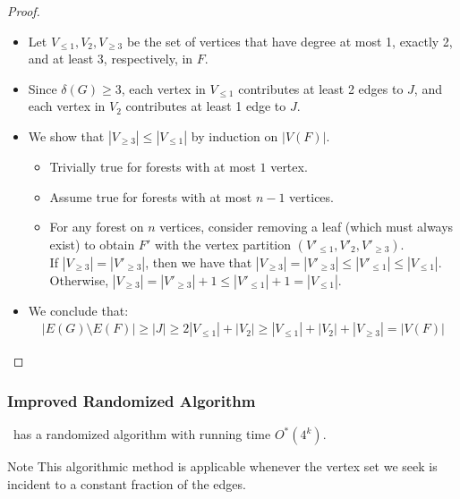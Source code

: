 \begin{frame}[c]
\begin{proof}
    \begin{itemize}
        \item Let $V_{\leq 1}, V_{2}, V_{\geq 3} $ be the set of vertices that have degree at most 1, exactly 2, and at least 3, respectively, in $F$. 
        \pause
        \item     Since $\delta(G)\ge 3$, each vertex in $V_{\leq 1}$ contributes at least 2 edges to $J$, and each vertex in $V_{2}$ contributes at least 1 edge to $J$. 
        \pause
        \item We show that $|V_{\geq 3}| \le |V_{\leq 1}|$ by induction on $|V(F)|$.
        \begin{itemize}
            \item Trivially true for forests with at most $1$ vertex.
            \item Assume true for forests with at most $n - 1$ vertices.
            \item For any forest on $n$ vertices, consider removing a leaf (which must always exist) to obtain $F'$ with the vertex partition $(V'_{\leq 1}, V'_{2}, V'_{\geq 3})$.\\
            If $|V_{\geq 3}|=|V'_{\geq 3}|$, then we have that $|V_{\geq 3}|=|V'_{\geq 3}|\le |V'_{\leq 1}|\le |V_{\leq 1}|$.\\
            Otherwise, $|V_{\geq 3}|=|V'_{\geq 3}|+1 \leq |V'_{\leq 1}| + 1 = |V_{\leq 1}|$.
        \end{itemize}

        \pause
        \item We conclude that:
        \begin{align*}
         |E(G) \setminus E(F)| \geq |J| \geq 2 |V_{\leq 1}| + |V_2| \ge |V_{\leq 1}| + |V_2| + |V_{\geq 3}| = |V(F)|
        \end{align*}
    \end{itemize}
\end{proof}
\end{frame}


\begin{frame}[c]\frametitle{Improved Randomized Algorithm}
    
    
    \begin{theorem}
    	\FVS\ has a randomized algorithm with running time $O^*(4^k)$.
    \end{theorem}

	\noindent
	\begin{block}{Note}
		This algorithmic method is applicable whenever the vertex set we seek is incident to a constant fraction of the edges.
	\end{block}

\end{frame}


